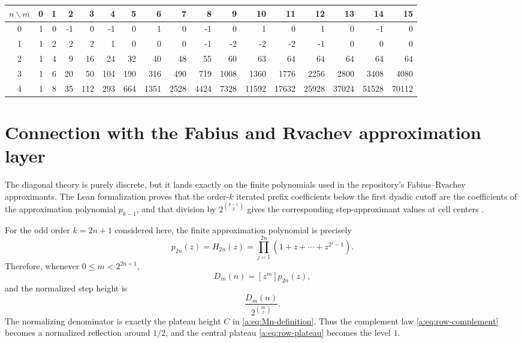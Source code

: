 \documentclass[11pt,a4paper,oneside,openany]{book}
\numberwithin{equation}{chapter}
\theoremstyle{definition}
\theoremstyle{remark}
\newcommand{\Diag}{D}
\begin{document}
\begin{center}
\scriptsize
\setlength{\tabcolsep}{3.6pt}
\begin{tabular}{c|rrrrrrrrrrrrrrrr}
\toprule
$n\backslash m$&0&1&2&3&4&5&6&7&8&9&10&11&12&13&14&15\\
\midrule
0&1&0&-1&0&-1&0&1&0&-1&0&1&0&1&0&-1&0\\
1&1&2&2&2&1&0&0&0&-1&-2&-2&-2&-1&0&0&0\\
2&1&4&9&16&24&32&40&48&55&60&63&64&64&64&64&64\\
3&1&6&20&50&104&190&316&490&719&1008&1360&1776&2256&2800&3408&4080\\
4&1&8&35&112&293&664&1351&2528&4424&7328&11592&17632&25928&37024&51528&70112\\
\bottomrule
\end{tabular}
\end{center}
\chapter{Connection with the Fabius and Rvachev approximation layer}
\label{b:sec:fabius}\label{ch:fabius}

The diagonal theory is purely discrete, but it lands exactly on the finite
polynomials used in the repository's Fabius--Rvachev approximants.  The Lean
formalization proves that the order-$k$ iterated prefix coefficients below the
first dyadic cutoff are the coefficients of the approximation polynomial
$p_{k-1}$, and that division by
$2^{\binom{k-1}{2}}$ gives the corresponding step-approximant values at cell
centers \cite{proveit-approx}.

For the odd order $k=2n+1$ considered here, the finite approximation
polynomial is precisely
\begin{equation}
 p_{2n}(z)=H_{2n}(z)
 =\prod_{j=1}^{2n}(1+z+\cdots+z^{2^j-1}).
 \label{b:eq:p-H}
\end{equation}
Therefore, whenever $0\le m<2^{2n+1}$,
\begin{equation}
 \Diag_m(n)=[z^m]p_{2n}(z),
 \label{b:eq:D-approx-coeff}
\end{equation}
and the normalized step height is
\begin{equation}
 \frac{\Diag_m(n)}{2^{\binom{2n}{2}}}.
 \label{b:eq:normalized-edge}
\end{equation}
The normalizing denominator is exactly the plateau height $C$ in
\eqref{a:eq:Mn-definition}.  Thus the complement law
\eqref{a:eq:row-complement} becomes a normalized reflection around $1/2$,
and the central plateau \eqref{a:eq:row-plateau} becomes the level $1$.
\end{document}

